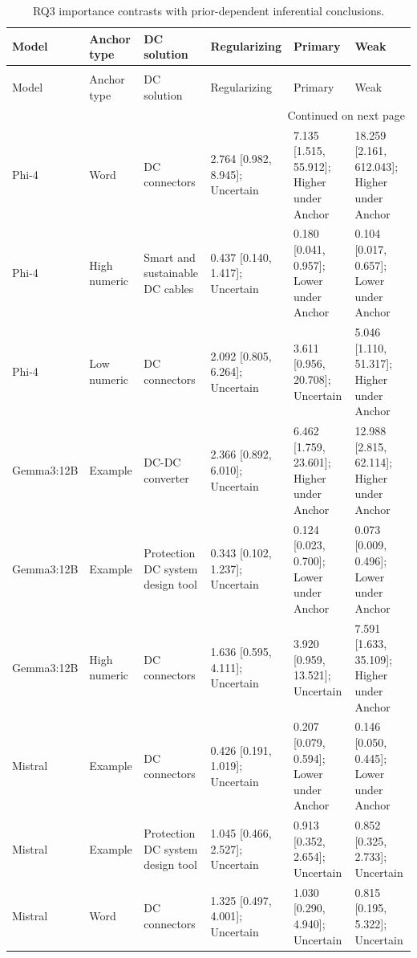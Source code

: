 \begin{longtable}[tbp]{p{1.8cm}p{2.0cm}p{3.7cm}p{3.7cm}p{3.7cm}p{3.7cm}}
\caption{RQ3 importance contrasts with prior-dependent inferential conclusions.} \label{tab:rq3_importance_prior_sensitive_contrasts} \\
\toprule
Model & Anchor type & DC solution & Regularizing & Primary & Weak \\
\midrule
\endfirsthead
\caption[]{RQ3 importance contrasts with prior-dependent inferential conclusions.} \\
\toprule
Model & Anchor type & DC solution & Regularizing & Primary & Weak \\
\midrule
\endhead
\midrule
\multicolumn{6}{r}{Continued on next page} \\
\midrule
\endfoot
\bottomrule
\endlastfoot
Phi-4 & Word & DC connectors & 2.764 [0.982, 8.945]; Uncertain & 7.135 [1.515, 55.912]; Higher under Anchor & 18.259 [2.161, 612.043]; Higher under Anchor \\
Phi-4 & High numeric & Smart and sustainable DC cables & 0.437 [0.140, 1.417]; Uncertain & 0.180 [0.041, 0.957]; Lower under Anchor & 0.104 [0.017, 0.657]; Lower under Anchor \\
Phi-4 & Low numeric & DC connectors & 2.092 [0.805, 6.264]; Uncertain & 3.611 [0.956, 20.708]; Uncertain & 5.046 [1.110, 51.317]; Higher under Anchor \\
Gemma3:12B & Example & DC-DC converter & 2.366 [0.892, 6.010]; Uncertain & 6.462 [1.759, 23.601]; Higher under Anchor & 12.988 [2.815, 62.114]; Higher under Anchor \\
Gemma3:12B & Example & Protection DC system design tool & 0.343 [0.102, 1.237]; Uncertain & 0.124 [0.023, 0.700]; Lower under Anchor & 0.073 [0.009, 0.496]; Lower under Anchor \\
Gemma3:12B & High numeric & DC connectors & 1.636 [0.595, 4.111]; Uncertain & 3.920 [0.959, 13.521]; Uncertain & 7.591 [1.633, 35.109]; Higher under Anchor \\
Mistral & Example & DC connectors & 0.426 [0.191, 1.019]; Uncertain & 0.207 [0.079, 0.594]; Lower under Anchor & 0.146 [0.050, 0.445]; Lower under Anchor \\
Mistral & Example & Protection DC system design tool & 1.045 [0.466, 2.527]; Uncertain & 0.913 [0.352, 2.654]; Uncertain & 0.852 [0.325, 2.733]; Uncertain \\
Mistral & Word & DC connectors & 1.325 [0.497, 4.001]; Uncertain & 1.030 [0.290, 4.940]; Uncertain & 0.815 [0.195, 5.322]; Uncertain \\

\end{longtable}
